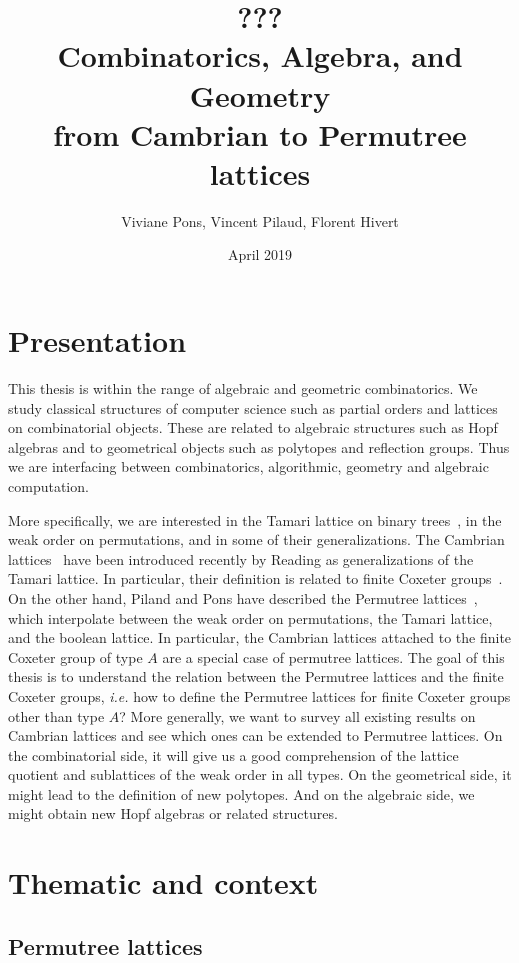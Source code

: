 \documentclass[a4paper,12pt]{article}
\title{\huge \bf ???  \\ Combinatorics, Algebra, and Geometry \\ from Cambrian to Permutree lattices}
\author{Viviane Pons, Vincent Pilaud, Florent Hivert}
\date{April 2019}
\begin{document}
\maketitle

\section{Presentation}

This thesis is within the range of algebraic and geometric combinatorics. We study classical structures of computer science such as partial orders and lattices on combinatorial objects. These are related to algebraic structures such as Hopf algebras and to geometrical objects such as polytopes and reflection groups. Thus we are interfacing between combinatorics, algorithmic, geometry and algebraic computation.

More specifically, we are interested in the Tamari lattice on binary trees~\cite{Tamari, HuangTamari, TamariFestschrift}, in the weak order on permutations, and in some of their generalizations. The Cambrian lattices~\cite{Reading-cambrianLattices} have been introduced recently by Reading as generalizations of the Tamari lattice. In particular, their definition is related to finite Coxeter groups~\cite{Reading-FiniteCoxeterGroupsChapter}. On the other hand, Piland and Pons have described the Permutree lattices~\cite{PilaudPons-permutrees}, which interpolate between the weak order on permutations, the Tamari lattice, and the boolean lattice. In particular, the Cambrian lattices attached to the finite Coxeter group of type $A$ are a special case of permutree lattices. The goal of this thesis is to understand the relation between the Permutree lattices and the finite Coxeter groups, \emph{i.e.} how to define the Permutree lattices for finite Coxeter groups other than type $A$? More generally, we want to survey all existing results on Cambrian lattices and see which ones can be extended to Permutree lattices. On the combinatorial side, it will give us a good comprehension of the lattice quotient and sublattices of the weak order in all types. On the geometrical side, it might lead to the definition of new polytopes. And on the algebraic side, we might obtain new Hopf algebras or related structures.

\section{Thematic and context}

\subsection{Permutree lattices}
\end{document}
